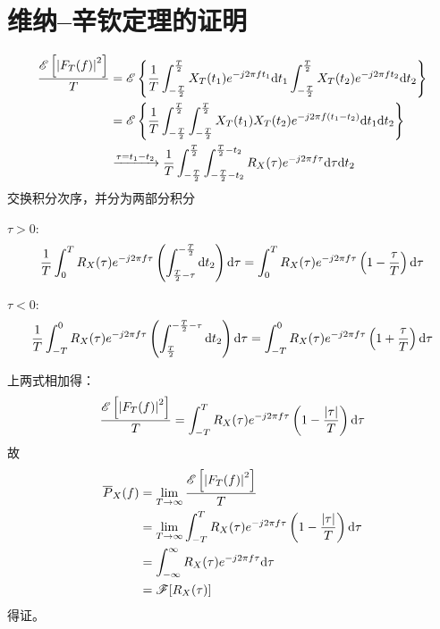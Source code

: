 \section{维纳--辛钦定理的证明}\label{appendix:V}
\Proof

\begin{equation*}
    \begin{split}
        \frac{\mathscr{E}\left[\left\vert F_T(f) \right\vert^2\right]}{T}&=\mathscr{E}\left\{\frac{1}{T}\int_{-\frac{T}{2}}^{\frac{T}{2}}X_T(t_1)e^{-j2\pi ft_1}\text{\upshape d} t_1\int_{-\frac{T}{2}}^{\frac{T}{2}}X_T(t_2)e^{-j2\pi ft_2}\text{\upshape d} t_2\right\} \\
        &=\mathscr{E}\left\{\frac{1}{T}\int_{-\frac{T}{2}}^{\frac{T}{2}}\int_{-\frac{T}{2}}^{\frac{T}{2}}X_T(t_1)X_T(t_2)e^{-j2\pi f(t_1-t_2)}\text{\upshape d} t_1\text{\upshape d} t_2\right\}\\
        &\xrightarrow[]{\tau=t_1-t_2}\frac{1}{T}\int_{-\frac{T}{2}}^{\frac{T}{2}}\int_{-\frac{T}{2}-t_2}^{\frac{T}{2}-t_2}R_X(\tau)e^{-j2\pi f\tau}\text{\upshape d} \tau\text{\upshape d} t_2
    \end{split}
\end{equation*}
交换积分次序，并分为两部分积分

$\tau>0$:
\begin{equation*}
   \frac{1}{T}\int_{0}^{T}R_X(\tau)e^{-j2\pi f\tau}\left(\int_{\frac{T}{2}-\tau}^{-\frac{T}{2}}\text{\upshape d} t_2\right)\text{\upshape d}\tau=\int_{0}^{T}R_X(\tau)e^{-j2\pi f\tau}\left(1-\frac{\tau}{T}\right)\text{\upshape d}\tau
\end{equation*}

$\tau<0$:
\begin{equation*}
   \frac{1}{T}\int_{-T}^{0}R_X(\tau)e^{-j2\pi f\tau}\left(\int_{\frac{T}{2}}^{-\frac{T}{2}-\tau}\text{\upshape d} t_2\right)\text{\upshape d}\tau=\int_{-T}^{0}R_X(\tau)e^{-j2\pi f\tau}\left(1+\frac{\tau}{T}\right)\text{\upshape d}\tau
\end{equation*}

上两式相加得：
\begin{equation*}
    \frac{\mathscr{E}\left[\left\vert F_T(f) \right\vert^2\right]}{T}=\int_{-T}^{T}R_X(\tau)e^{-j2\pi f\tau}\left(1-\frac{\left\vert \tau \right\vert}{T}\right)\text{\upshape d}\tau
\end{equation*}
故
\begin{equation*}
    \begin{split}
        \overline{P}_X(f)   &=\lim_{T\to\infty}\frac{\mathscr{E}\left[\left\vert F_T(f) \right\vert^2\right]}{T}\\
                            &=\lim_{T\to\infty}\int_{-T}^{T}R_X(\tau)e^{-j2\pi f\tau}\left(1-\frac{\left\vert \tau \right\vert}{T}\right)\text{\upshape d}\tau\\
                            &=\int_{-\infty}^{\infty}R_X(\tau)e^{-j2\pi f\tau}\text{\upshape d}\tau\\
                            &=\mathscr{F}[R_X(\tau)]
    \end{split}
\end{equation*}
得证。